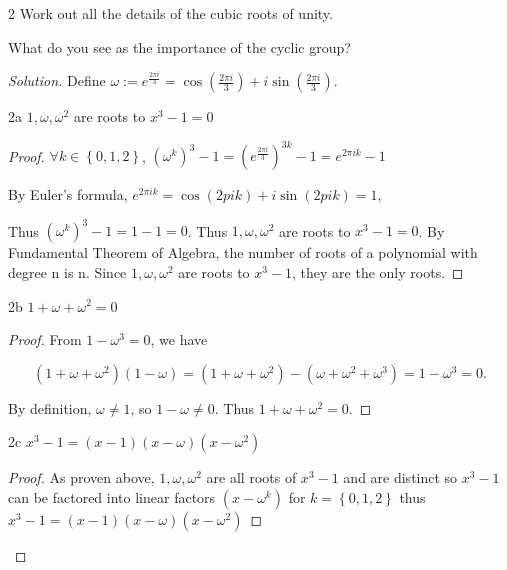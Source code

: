 \documentclass{article}
\newenvironment{solution}
{\renewcommand\qedsymbol{$\blacksquare$}\begin{proof}[Solution]}
{\end{proof}}
\begin{document}
\begin{PROB}{2}\label{Problem 2.}
    Work out all the details of the cubic roots of unity.

    What do you see as the importance of the cyclic group?
\end{PROB}
\begin{solution}
    Define $\omega := e^{\frac{2 \pi i}{3}} = \cos(\frac{2 \pi i}{3}) + i \sin(\frac{2 \pi i}{3})$.

    \begin{claim}{2a}\label{Claim 2a.}
        $1, \omega, \omega^2$ are roots to $x^3 - 1 = 0$  
    \end{claim}
    \begin{proof}
        $\forall k \in \left\{ 0, 1, 2 \right\}$, 
        $(\omega^k)^3 - 1= (e^{\frac{2 \pi  i}{3}})^{3k} - 1 = e^{2 \pi ik} - 1$
        
        By Euler's formula, $e^{2 \pi ik} = \cos(2pi k) + i\sin(2pi k) = 1$,
        
        Thus $(\omega^k)^3 - 1 = 1 - 1 = 0$. Thus $1, \omega, \omega^2$ are roots to $x^3 - 1 = 0$. By Fundamental Theorem of Algebra, the number of roots of a polynomial with degree n is n. Since $1, \omega, \omega^2$ are roots to $x^3 - 1$, they are the only roots.  
    \end{proof}

    \begin{claim}{2b}\label{Claim 2b.}
        $1 + \omega + \omega^2 = 0$ 
    \end{claim}
    \begin{proof}
        From $1 - \omega^3 = 0$, we have
        
        \[
        (1 + \omega + \omega^2)(1 - \omega) = (1 + \omega + \omega^2) - (\omega + \omega^2 + \omega^3) = 1 - \omega^3 = 0.
        \]

        By definition, $\omega \neq 1$, so $1 - \omega \neq 0$. Thus $1 + \omega + \omega^2 = 0$.   
    \end{proof}

    \begin{claim}{2c}\label{Claim 2c.}
        $x^3 - 1 = (x - 1)(x - \omega)(x - \omega^2)$ 
    \end{claim}
    \begin{proof}
        As proven above, $1, \omega, \omega^2$ are all roots of $x^3 - 1$ and are distinct so $x^3 - 1$ can be factored into linear factors $(x - \omega^k)$ for $k = \left\{ 0, 1, 2 \right\}$  thus $x^3 - 1= (x - 1)(x - \omega)(x - \omega^2)$    
    \end{proof}


\end{solution}
\end{document}
